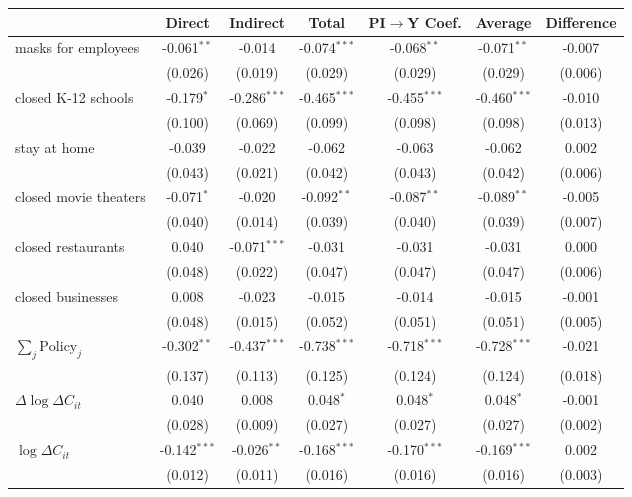 
\begin{tabular}{lccccc|>{}c}
\toprule
  & Direct & Indirect & Total & PI$\to$Y Coef. & Average & Difference\\
\midrule
masks for employees & -0.061$^{**}$ & -0.014 & -0.074$^{***}$ & -0.068$^{**}$ & -0.071$^{**}$ & -0.007\\
 & (0.026) & (0.019) & (0.029) & (0.029) & (0.029) & (0.006)\\
closed K-12 schools & -0.179$^{*}$ & -0.286$^{***}$ & -0.465$^{***}$ & -0.455$^{***}$ & -0.460$^{***}$ & -0.010\\
 & (0.100) & (0.069) & (0.099) & (0.098) & (0.098) & (0.013)\\
stay at home & -0.039 & -0.022 & -0.062 & -0.063 & -0.062 & 0.002\\
 & (0.043) & (0.021) & (0.042) & (0.043) & (0.042) & (0.006)\\
closed movie theaters & -0.071$^{*}$ & -0.020 & -0.092$^{**}$ & -0.087$^{**}$ & -0.089$^{**}$ & -0.005\\
 & (0.040) & (0.014) & (0.039) & (0.040) & (0.039) & (0.007)\\
closed restaurants & 0.040 & -0.071$^{***}$ & -0.031 & -0.031 & -0.031 & 0.000\\
 & (0.048) & (0.022) & (0.047) & (0.047) & (0.047) & (0.006)\\
closed businesses & 0.008 & -0.023 & -0.015 & -0.014 & -0.015 & -0.001\\
 & (0.048) & (0.015) & (0.052) & (0.051) & (0.051) & (0.005)\\
$\sum_j \mathrm{Policy}_j$ & -0.302$^{**}$ & -0.437$^{***}$ & -0.738$^{***}$ & -0.718$^{***}$ & -0.728$^{***}$ & -0.021\\
 & (0.137) & (0.113) & (0.125) & (0.124) & (0.124) & (0.018)\\
$\Delta \log \Delta C_{it}$ & 0.040 & 0.008 & 0.048$^{*}$ & 0.048$^{*}$ & 0.048$^{*}$ & -0.001\\
 & (0.028) & (0.009) & (0.027) & (0.027) & (0.027) & (0.002)\\
$\log \Delta C_{it}$ & -0.142$^{***}$ & -0.026$^{**}$ & -0.168$^{***}$ & -0.170$^{***}$ & -0.169$^{***}$ & 0.002\\
 & (0.012) & (0.011) & (0.016) & (0.016) & (0.016) & (0.003)\\
\bottomrule
\end{tabular}